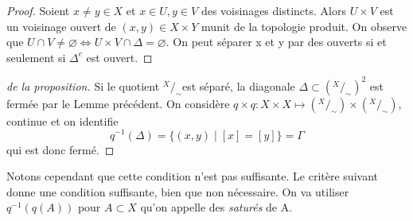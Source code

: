\documentclass[12pt]{book}
\theoremstyle{definition}
\theoremstyle{remark}
\newcommand*\quot[2]{{^{\textstyle #1}\big/_{\textstyle #2}}}
\begin{document}
	\begin{proof}
		Soient $x \neq y \in X$ et  $x \in U, y \in V$ des voisinages distincts. Alors  $U\times V$ est un voisinage ouvert de  $(x,y) \in X\times Y$ munit de la topologie produit. On observe que  $U\cap V \neq \varnothing \iff U\times V \cap \Delta = \varnothing$. On peut séparer x et y par des ouverts si et seulement si $\Delta^c$ est ouvert.
	\end{proof}
	\begin{proof}[de la proposition]
		Si le quotient $\quot{X}{\sim}$est séparé, la diagonale $\Delta \subset (\quot{X}{\sim})^2$ est fermée par le Lemme précédent. On considère $q\times q : X \times X \longmapsto (\quot{X}{\sim}) \times (\quot{X}{\sim})$, continue et on identifie \[
			q^{-1}(\Delta) = \{(x,y) \;|\; [x] = [y]\} = \Gamma 
		\] qui est donc fermé.	
	\end{proof}
	Notons cependant que cette condition n'est pas suffisante. Le critère suivant donne une condition suffisante, bien que non nécessaire. On va utiliser $q^{-1}(q(A))$ pour  $A \subset X$ qu'on appelle des \emph{saturés} de A.
\end{document}
